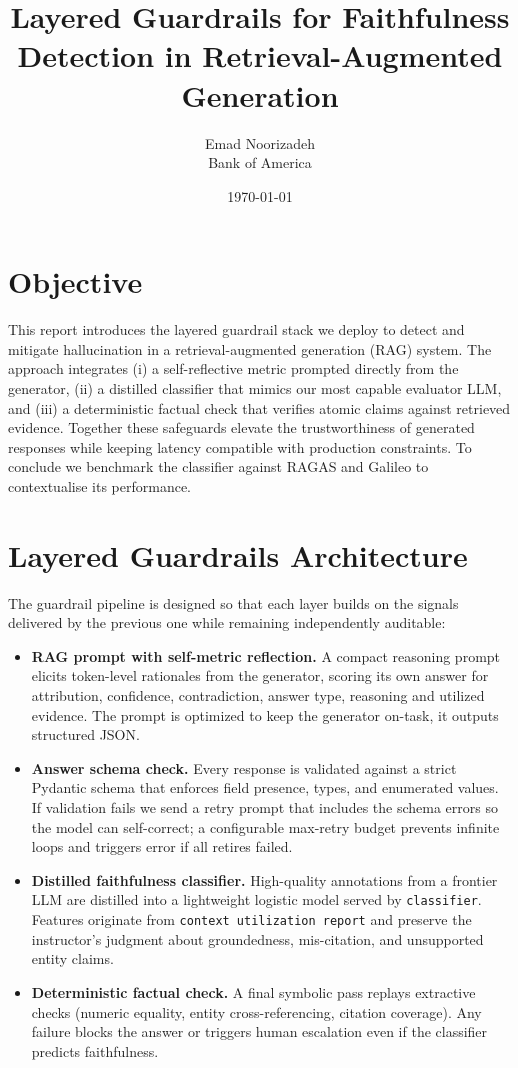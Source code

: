 \documentclass[11pt]{article}
\title{Layered Guardrails for Faithfulness Detection in Retrieval-Augmented Generation}
\author{Emad Noorizadeh\\Bank of America}
\date{\today}
\begin{document}
\maketitle

\section*{Objective}
This report introduces the layered guardrail stack we deploy to detect and mitigate hallucination in a retrieval-augmented generation (RAG) system. The approach integrates (i) a self-reflective metric prompted directly from the generator, (ii) a distilled classifier that mimics our most capable evaluator LLM, and (iii) a deterministic factual check that verifies atomic claims against retrieved evidence. Together these safeguards elevate the trustworthiness of generated responses while keeping latency compatible with production constraints. To conclude we benchmark the classifier against RAGAS and Galileo to contextualise its performance.

\section{Layered Guardrails Architecture}
The guardrail pipeline is designed so that each layer builds on the signals delivered by the previous one while remaining independently auditable:
\begin{itemize}
  \item \textbf{RAG prompt with self-metric reflection.} A compact reasoning prompt elicits token-level rationales from the generator, scoring its own answer for attribution, confidence, contradiction, answer type, reasoning and utilized evidence. The prompt is optimized to keep the generator on-task, it outputs structured JSON.
  \item \textbf{Answer schema check.} Every response is validated against a strict Pydantic schema that enforces field presence, types, and enumerated values. If validation fails we send a retry prompt that includes the schema errors so the model can self-correct; a configurable max-retry budget prevents infinite loops and triggers error if all retires failed.
  \item \textbf{Distilled faithfulness classifier.} High-quality annotations from a frontier LLM are distilled into a lightweight logistic model served by \texttt{classifier}. Features originate from \texttt{context utilization report} and preserve the instructor's judgment about groundedness, mis-citation, and unsupported entity claims.
  \item \textbf{Deterministic factual check.} A final symbolic pass replays extractive checks (numeric equality, entity cross-referencing, citation coverage). Any failure blocks the answer or triggers human escalation even if the classifier predicts faithfulness.
\end{itemize}
\end{document}
